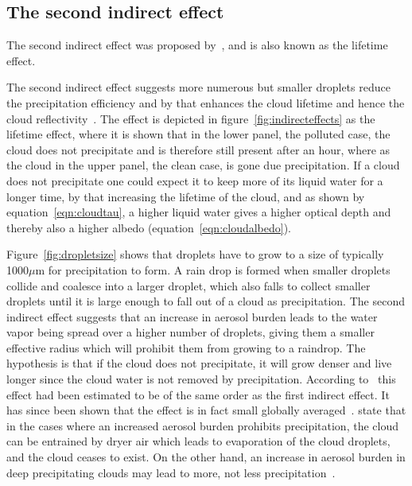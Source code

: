 \subsection{The second indirect effect}
The second indirect effect was proposed by~\citet{Albrecht1989}, and is also known as the lifetime effect.

The second indirect effect suggests more numerous but smaller droplets reduce the precipitation efficiency and by that enhances the cloud lifetime and hence the cloud reflectivity~\citep{Albrecht1989}. The effect is depicted in figure~\ref{fig:indirecteffects} as the lifetime effect, where it is shown that in the lower panel, the polluted case, the cloud does not precipitate and is therefore still present after an hour, where as the cloud in the upper panel, the clean case, is gone due precipitation. If a cloud does not precipitate one could expect it to keep more of its liquid water for a longer time, by that increasing the lifetime of the cloud, and as shown by equation~\ref{eqn:cloudtau}, a higher liquid water gives a higher optical depth and thereby also a higher albedo (equation~\ref{eqn:cloudalbedo}).

Figure~\ref{fig:dropletsize} shows that droplets have to grow to a size of typically 1000$\mu\text{m}$ for precipitation to form. A rain drop is formed when smaller droplets collide and coalesce into a larger droplet, which also falls to collect smaller droplets until it is large enough to fall out of a cloud as precipitation. The second indirect effect suggests that an increase in aerosol burden leads to the water vapor being spread over a higher number of droplets, giving them a smaller effective radius which will prohibit them from growing to a raindrop. The hypothesis is that if the cloud does not precipitate, it will grow denser and live longer since the cloud water is not removed by precipitation. According to~\citet{Lohmann2005} this effect had been estimated to be of the same order as the first indirect effect. It has since been shown that the effect is in fact small globally averaged~\citep{Stevens2009}. \citet{Stevens2009} state that in the cases where an increased aerosol burden prohibits precipitation, the cloud can be entrained by dryer air which leads to evaporation of the cloud droplets, and the cloud ceases to exist. On the other hand, an increase in aerosol burden in deep precipitating clouds may lead to more, not less precipitation~\citep{Stevens2008}.


